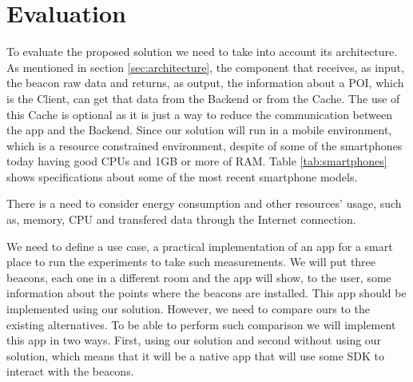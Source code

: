
% 
% 

\section{Evaluation}
\label{sec:evaluation}


To evaluate the proposed solution we need to 
take into account its
architecture. As mentioned in section 
\ref{sec:architecture},
the component that receives, as input, the beacon raw data and
returns, as output, the information about a POI,
which is the
Client, can get that data from the Backend or 
from the Cache.
The use of this Cache is optional as it is just a 
way to reduce
the communication between the app and the Backend.
Since our solution will run in a mobile environment, 
which is a resource constrained environment,
despite of some of the smartphones today having
good CPUs and 1GB or more of RAM.
Table \ref{tab:smartphones} shows specifications about some 
of the most recent smartphone models.

There is a need to consider energy consumption and other resources'
usage, such as, memory, CPU and transfered data through the
Internet connection.

We need to define a use case, a practical implementation
of an app for a smart place to run the experiments
to take such measurements. We will put three beacons,
each one in a different room and the app will show, to the user,
some information about the points where the beacons
are installed.
This app should be implemented using our solution.
However, we need to compare ours to the existing
alternatives. To be able to perform such comparison
we will implement this app in two ways.
First, using our solution and second without using
our solution, which means that it will be a native
app that will use some SDK to interact with the
beacons.


